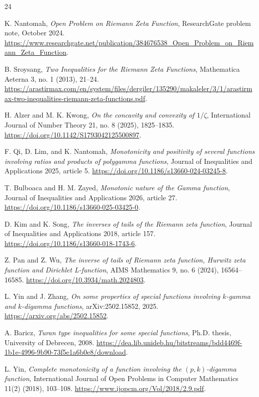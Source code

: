 \documentclass[11pt]{article}
\numberwithin{equation}{section}
\theoremstyle{definition}
\theoremstyle{remark}
\newcommand{\1}{\mathbf 1}
\begin{document}
\begin{thebibliography}{24}

K. Nantomah,
\emph{Open Problem on Riemann Zeta Function},
ResearchGate problem note, October 2024.
\url{https://www.researchgate.net/publication/384676538_Open_Problem_on_Riemann_Zeta_Function}.

B. Sroysang,
\emph{Two Inequalities for the Riemann Zeta Functions},
Mathematica Aeterna 3, no. 1 (2013), 21--24.
\url{https://arastirmax.com/en/system/files/dergiler/135290/makaleler/3/1/arastirmax-two-inequalities-riemann-zeta-functions.pdf}.

H. Alzer and M. K. Kwong,
\emph{On the concavity and convexity of \(1/\zeta\)},
International Journal of Number Theory 21, no. 8 (2025), 1825--1835.
\url{https://doi.org/10.1142/S1793042125500897}.

F. Qi, D. Lim, and K. Nantomah,
\emph{Monotonicity and positivity of several functions involving ratios and products of polygamma functions},
Journal of Inequalities and Applications 2025, article 5.
\url{https://doi.org/10.1186/s13660-024-03245-8}.

T. Bulboaca and H. M. Zayed,
\emph{Monotonic nature of the Gamma function},
Journal of Inequalities and Applications 2026, article 27.
\url{https://doi.org/10.1186/s13660-025-03425-0}.

D. Kim and K. Song,
\emph{The inverses of tails of the Riemann zeta function},
Journal of Inequalities and Applications 2018, article 157.
\url{https://doi.org/10.1186/s13660-018-1743-6}.

Z. Pan and Z. Wu,
\emph{The inverse of tails of Riemann zeta function, Hurwitz zeta function and Dirichlet L-function},
AIMS Mathematics 9, no. 6 (2024), 16564--16585.
\url{https://doi.org/10.3934/math.2024803}.


L. Yin and J. Zhang,
\emph{On some properties of special functions involving \(k\)-gamma and \(k\)-digamma functions},
arXiv:2502.15852, 2025.
\url{https://arxiv.org/abs/2502.15852}.


A. Baricz,
\emph{Turan type inequalities for some special functions},
Ph.D. thesis, University of Debrecen, 2008.
\url{https://dea.lib.unideb.hu/bitstreams/bdd4469f-1b1e-4996-9b90-73f5e1a6b0e8/download}.

L. Yin,
\emph{Complete monotonicity of a function involving the \((p,k)\)-digamma function},
International Journal of Open Problems in Computer Mathematics 11(2) (2018), 103--108.
\url{https://www.ijopcm.org/Vol/2018/2.9.pdf}.



\end{thebibliography}
\end{document}
